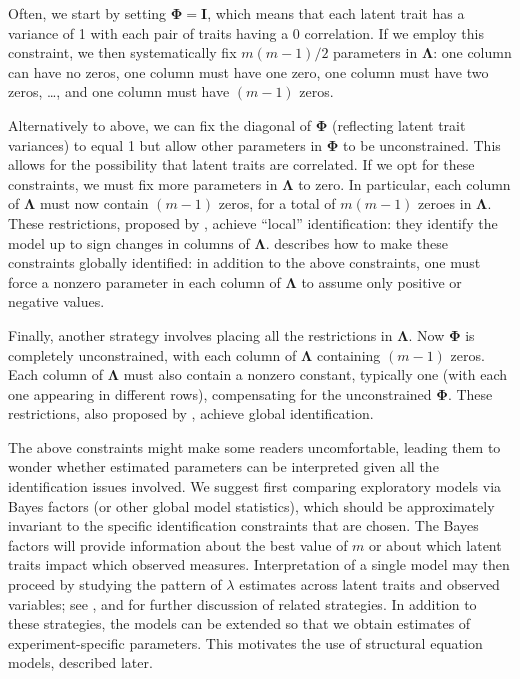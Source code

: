 Often, we start by setting $\bm{\Phi} = \bm{I}$, which means that each latent trait has a variance of 1 with each pair of traits having a 0 correlation.  If we employ this constraint, we then systematically fix $m(m-1)/2$ parameters in $\bm{\Lambda}$: one column can have no zeros, one column must have one zero, one column must have two zeros, \ldots, and one column must have $(m-1)$ zeros.

Alternatively to above, we can fix the diagonal of $\bm{\Phi}$ (reflecting latent trait variances) to equal 1 but allow other parameters in $\bm{\Phi}$ to be unconstrained.  This allows for the possibility that latent traits are correlated.  If we opt for these constraints, we must fix more parameters in $\bm{\Lambda}$ to zero.  In particular, each column of $\bm{\Lambda}$ must now contain $(m-1)$ zeros, for a total of $m(m-1)$ zeroes in $\bm{\Lambda}$.  These restrictions, proposed by , achieve ``local'' identification: they identify the model up to sign changes in columns of $\bm{\Lambda}$.  describes how to make these constraints globally identified: in addition to the above constraints, one must force a nonzero parameter in each column of $\bm{\Lambda}$ to assume only positive or negative values.  

Finally, another strategy involves placing all the restrictions in $\bm{\Lambda}$.  Now $\bm{\Phi}$ is completely unconstrained, with each column of $\bm{\Lambda}$ containing $(m-1)$ zeros.  Each column of $\bm{\Lambda}$ must also contain a nonzero constant, typically one (with each one appearing in different rows), compensating for the unconstrained $\bm{\Phi}$.  These restrictions, also proposed by , achieve global identification.

The above constraints might make some readers uncomfortable, leading them to wonder whether estimated parameters can be interpreted given all the identification issues involved.  We suggest first comparing
exploratory models via Bayes factors (or other global model statistics), which should be approximately invariant to the specific identification constraints that are chosen. The Bayes factors will provide information about the best value of $m$ or about which latent traits impact which observed measures.  Interpretation of a single model may then proceed by studying the pattern of $\lambda$ estimates across latent traits and observed variables; see , and  for further discussion of related strategies.  In addition to these strategies, the models can be extended so that we obtain estimates of experiment-specific parameters.  This motivates the use of structural equation models, described later.

